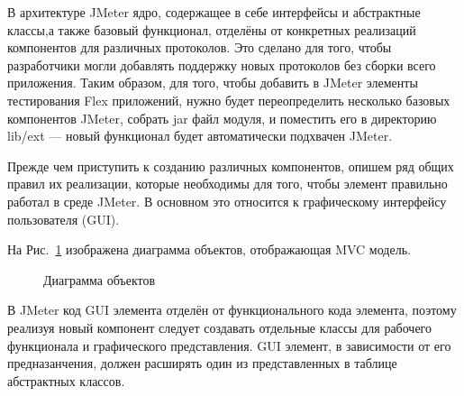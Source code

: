 В архитектуре JMeter ядро, содержащее в себе интерфейсы и абстрактные классы,а также базовый функционал,
отделёны от конкретных реализаций компонентов для различных протоколов. Это сделано для того, чтобы разработчики
могли добавлять поддержку новых протоколов без сборки всего приложения. Таким образом, для того, чтобы добавить
в JMeter элементы тестирования Flex приложений, нужно будет переопределить несколько базовых
компонентов JMeter, собрать jar файл модуля, и поместить его в директорию lib/ext --- новый функционал будет
автоматически подхвачен JMeter.

Прежде чем приступить к созданию различных компонентов, опишем ряд общих правил их реализации,
которые необходимы для того, чтобы элемент правильно работал в среде JMeter. В основном это относится к
графическому интерфейсу пользователя (GUI).

На Рис.~\ref{ris:Diagram2.png} изображена диаграмма объектов, отображающая MVC модель.

\begin{figure}[ht]
\caption{Диаграмма объектов}
\label{ris:Diagram2.png}
\end{figure}

В JMeter код GUI элемента отделён от функционального кода элемента, поэтому реализуя новый компонент следует
создавать отдельные классы для рабочего функционала и графического представления. GUI элемент, в зависимости
от его предназанчения, должен расширять один из представленных в таблице абстрактных классов.

